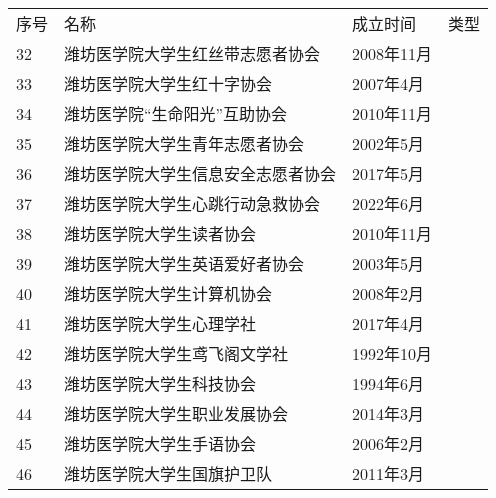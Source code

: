 \newpage
\begin{center}
    \begin{tabular}{|>{\centering\arraybackslash}p{2em}|>{\centering\arraybackslash}p{22em}|%
    >{\centering\arraybackslash}p{6em}|>{\centering\arraybackslash}p{5em}|}
        \Xhline{1.2pt}
        序号 & 名称                    & 成立时间     & 类型                      \\
        \Xhline{1.2pt}
        32 & 潍坊医学院大学生红丝带志愿者协会  & 2008年11月 & \multirow{6}{*}{志愿公益类} \\
        \cline{1-3}
        33 & 潍坊医学院大学生红十字协会     & 2007年4月  &                        \\
        \cline{1-3}
        34 & 潍坊医学院“生命阳光”互助协会   & 2010年11月 &                        \\
        \cline{1-3}
        35 & 潍坊医学院大学生青年志愿者协会   & 2002年5月  &                        \\
        \cline{1-3}
        36 & 潍坊医学院大学生信息安全志愿者协会 & 2017年5月  &                        \\
        \cline{1-3}
        37 & 潍坊医学院大学生心跳行动急救协会  & 2022年6月  &                        \\
        \Xhline{1.2pt}
        38 & 潍坊医学院大学生读者协会      & 2010年11月 & \multirow{5}{*}{学术科技类} \\
        \cline{1-3}
        39 & 潍坊医学院大学生英语爱好者协会   & 2003年5月  &                        \\
        \cline{1-3}
        40 & 潍坊医学院大学生计算机协会     & 2008年2月  &                        \\
        \cline{1-3}
        41 & 潍坊医学院大学生心理学社      & 2017年4月  &                        \\
        \cline{1-3}
        42 & 潍坊医学院大学生鸢飞阁文学社    & 1992年10月 &                        \\
        \Xhline{1.2pt}
        43 & 潍坊医学院大学生科技协会      & 1994年6月  & \multirow{2}{*}{创新创业类} \\
        \cline{1-3}
        44 & 潍坊医学院大学生职业发展协会    & 2014年3月  &                        \\
        \Xhline{1.2pt}
        45 & 潍坊医学院大学生手语协会      & 2006年2月  & \multirow{7}{*}{自律互助类} \\
        \cline{1-3}
        46 & 潍坊医学院大学生国旗护卫队     & 2011年3月  &                        \\

\end{tabular}
\end{center}
